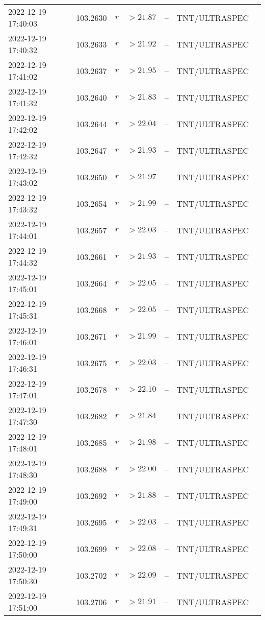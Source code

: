 \documentclass{nature_plusfigure}
\begin{document}
\begin{supplement}
\begin{center}
\begin{longtable}{lllllll}
2022-12-19 17:40:03 & 103.2630 & $r$ & $>21.87$ & -- & TNT/ULTRASPEC &  \\ 
2022-12-19 17:40:32 & 103.2633 & $r$ & $>21.92$ & -- & TNT/ULTRASPEC &  \\ 
2022-12-19 17:41:02 & 103.2637 & $r$ & $>21.95$ & -- & TNT/ULTRASPEC &  \\ 
2022-12-19 17:41:32 & 103.2640 & $r$ & $>21.83$ & -- & TNT/ULTRASPEC &  \\ 
2022-12-19 17:42:02 & 103.2644 & $r$ & $>22.04$ & -- & TNT/ULTRASPEC &  \\ 
2022-12-19 17:42:32 & 103.2647 & $r$ & $>21.93$ & -- & TNT/ULTRASPEC &  \\ 
2022-12-19 17:43:02 & 103.2650 & $r$ & $>21.97$ & -- & TNT/ULTRASPEC &  \\ 
2022-12-19 17:43:32 & 103.2654 & $r$ & $>21.99$ & -- & TNT/ULTRASPEC &  \\ 
2022-12-19 17:44:01 & 103.2657 & $r$ & $>22.03$ & -- & TNT/ULTRASPEC &  \\ 
2022-12-19 17:44:32 & 103.2661 & $r$ & $>21.93$ & -- & TNT/ULTRASPEC &  \\ 
2022-12-19 17:45:01 & 103.2664 & $r$ & $>22.05$ & -- & TNT/ULTRASPEC &  \\ 
2022-12-19 17:45:31 & 103.2668 & $r$ & $>22.05$ & -- & TNT/ULTRASPEC &  \\ 
2022-12-19 17:46:01 & 103.2671 & $r$ & $>21.99$ & -- & TNT/ULTRASPEC &  \\ 
2022-12-19 17:46:31 & 103.2675 & $r$ & $>22.03$ & -- & TNT/ULTRASPEC &  \\ 
2022-12-19 17:47:01 & 103.2678 & $r$ & $>22.10$ & -- & TNT/ULTRASPEC &  \\ 
2022-12-19 17:47:30 & 103.2682 & $r$ & $>21.84$ & -- & TNT/ULTRASPEC &  \\ 
2022-12-19 17:48:01 & 103.2685 & $r$ & $>21.98$ & -- & TNT/ULTRASPEC &  \\ 
2022-12-19 17:48:30 & 103.2688 & $r$ & $>22.00$ & -- & TNT/ULTRASPEC &  \\ 
2022-12-19 17:49:00 & 103.2692 & $r$ & $>21.88$ & -- & TNT/ULTRASPEC &  \\ 
2022-12-19 17:49:31 & 103.2695 & $r$ & $>22.03$ & -- & TNT/ULTRASPEC &  \\ 
2022-12-19 17:50:00 & 103.2699 & $r$ & $>22.08$ & -- & TNT/ULTRASPEC &  \\ 
2022-12-19 17:50:30 & 103.2702 & $r$ & $>22.09$ & -- & TNT/ULTRASPEC &  \\ 
2022-12-19 17:51:00 & 103.2706 & $r$ & $>21.91$ & -- & TNT/ULTRASPEC &  \\ 

\end{longtable}
\end{center}
\end{supplement}
\end{document}
